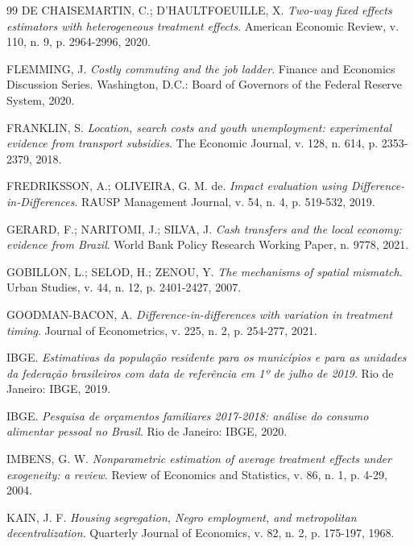 \documentclass[12pt, a4paper]{article}
\begin{document}
\begin{thebibliography}{99}
DE CHAISEMARTIN, C.; D’HAULTFOEUILLE, X. \textit{Two-way fixed effects estimators with heterogeneous treatment effects}. American Economic Review, v. 110, n. 9, p. 2964-2996, 2020.

FLEMMING, J. \textit{Costly commuting and the job ladder}. Finance and Economics Discussion Series. Washington, D.C.: Board of Governors of the Federal Reserve System, 2020.

FRANKLIN, S. \textit{Location, search costs and youth unemployment: experimental evidence from transport subsidies}. The Economic Journal, v. 128, n. 614, p. 2353-2379, 2018.

FREDRIKSSON, A.; OLIVEIRA, G. M. de. \textit{Impact evaluation using Difference-in-Differences}. RAUSP Management Journal, v. 54, n. 4, p. 519-532, 2019.

GERARD, F.; NARITOMI, J.; SILVA, J. \textit{Cash transfers and the local economy: evidence from Brazil}. World Bank Policy Research Working Paper, n. 9778, 2021.

GOBILLON, L.; SELOD, H.; ZENOU, Y. \textit{The mechanisms of spatial mismatch}. Urban Studies, v. 44, n. 12, p. 2401-2427, 2007.

GOODMAN-BACON, A. \textit{Difference-in-differences with variation in treatment timing}. Journal of Econometrics, v. 225, n. 2, p. 254-277, 2021.

IBGE. \textit{Estimativas da população residente para os municípios e para as unidades da federação brasileiros com data de referência em 1º de julho de 2019}. Rio de Janeiro: IBGE, 2019.

IBGE. \textit{Pesquisa de orçamentos familiares 2017-2018: análise do consumo alimentar pessoal no Brasil}. Rio de Janeiro: IBGE, 2020.

IMBENS, G. W. \textit{Nonparametric estimation of average treatment effects under exogeneity: a review}. Review of Economics and Statistics, v. 86, n. 1, p. 4-29, 2004.

KAIN, J. F. \textit{Housing segregation, Negro employment, and metropolitan decentralization}. Quarterly Journal of Economics, v. 82, n. 2, p. 175-197, 1968.


\end{thebibliography}
\end{document}
